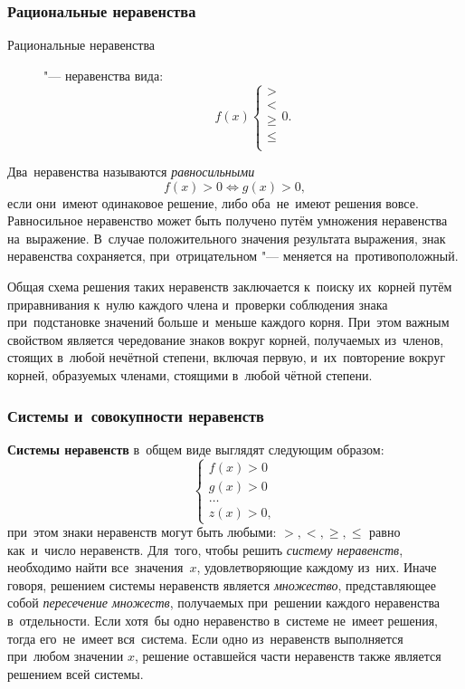 \documentclass[]{scrartcl}
\begin{document}
\subsubsection{Рациональные неравенства}
\begin{description}
	\item[Рациональные неравенства] "--- неравенства вида:
	\begin{equation}\label{eq:rational-inequal}
	f(x)
	\begin{cases}
	>\\
	<\\
	\geq\\
	\leq\\
	\end{cases}
	0.
	\end{equation}
\end{description}
Два~неравенства называются \emph{равносильными}
\begin{equation}\label{eq:rational-inequal-equiv}
f(x)>0 \Leftrightarrow g(x)>0,
\end{equation}
если они~имеют одинаковое решение, либо оба~не~имеют решения вовсе. Равносильное неравенство может быть получено путём умножения неравенства на~выражение. В~случае положительного значения результата выражения, знак неравенства сохраняется, при~отрицательном "--- меняется на~противоположный.

Общая схема решения таких неравенств заключается к~поиску их~корней путём приравнивания к~нулю каждого члена и~проверки соблюдения знака при~подстановке значений больше и~меньше каждого корня. При~этом важным свойством является чередование знаков вокруг корней, получаемых из~членов, стоящих в~любой нечётной степени, включая первую, и~их~повторение вокруг корней, образуемых членами, стоящими в~любой чётной степени.

\subsubsection{Системы и~совокупности неравенств}
\textbf{Системы неравенств} в~общем виде выглядят следующим образом:
\begin{equation}\label{eq:inequal-system}
	\begin{cases}
	f(x)>0\\
	g(x)>0\\
	\ldots\\
	z(x)>0,
	\end{cases}
\end{equation}
при~этом знаки неравенств могут быть любыми: ${\textstyle >,<,\geq,\leq}$ равно как~и~число неравенств. Для~того, чтобы решить \emph{систему неравенств}, необходимо найти все~значения~${\textstyle x}$, удовлетворяющие каждому из~них. Иначе говоря, решением системы неравенств является \emph{множество}, представляющее собой \emph{пересечение множеств}, получаемых при~решении каждого неравенства в~отдельности. Если хотя~бы одно неравенство в~системе не~имеет решения, тогда его~не~имеет вся~система. Если одно из~неравенств выполняется при~любом значении ${\textstyle x}$, решение оставшейся части неравенств также 
является решением всей системы.
\end{document}

